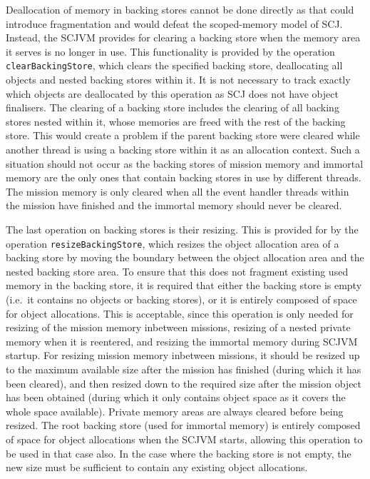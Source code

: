 Deallocation of memory in backing stores cannot be done directly as
that could introduce fragmentation and would defeat the scoped-memory
model of SCJ.
Instead, the SCJVM provides for clearing a backing store when the
memory area it serves is no longer in use.
This functionality is provided by the operation
\texttt{clear\-Backing\-Store}, which clears the specified backing
store, deallocating all objects and nested backing stores within it.
It is not necessary to track exactly which objects are deallocated by
this operation as SCJ does not have object finalisers.
The clearing of a backing store includes the clearing of all backing
stores nested within it, whose memories are freed with the rest of the
backing store.
This would create a problem if the parent backing store were cleared
while another thread is using a backing store within it as an
allocation context.
Such a situation should not occur as the backing stores of mission
memory and immortal memory are the only ones that contain backing
stores in use by different threads.
The mission memory is only cleared when all the event handler threads
within the mission have finished and the immortal memory should never
be cleared.

The last operation on backing stores is their resizing.
This is provided for by the operation \texttt{resizeBackingStore},
which resizes the object allocation area of a backing store by moving
the boundary between the object allocation area and the nested backing
store area.
To ensure that this does not fragment existing used memory in the
backing store, it is required that either the backing store is empty
(i.e.\ it contains no objects or backing stores), or it is entirely
composed of space for object allocations.
This is acceptable, since this operation is only needed for resizing
of the mission memory inbetween missions, resizing of a nested private
memory when it is reentered, and resizing the immortal memory during
SCJVM startup.
For resizing mission memory inbetween missions, it should be resized
up to the maximum available size after the mission has finished
(during which it has been cleared), and then resized down to the
required size after the mission object has been obtained (during which
it only contains object space as it covers the whole space available).
Private memory areas are always cleared before being resized.
The root backing store (used for immortal memory) is entirely composed
of space for object allocations when the SCJVM starts, allowing this
operation to be used in that case also.
In the case where the backing store is not empty, the new size must be
sufficient to contain any existing object allocations.

